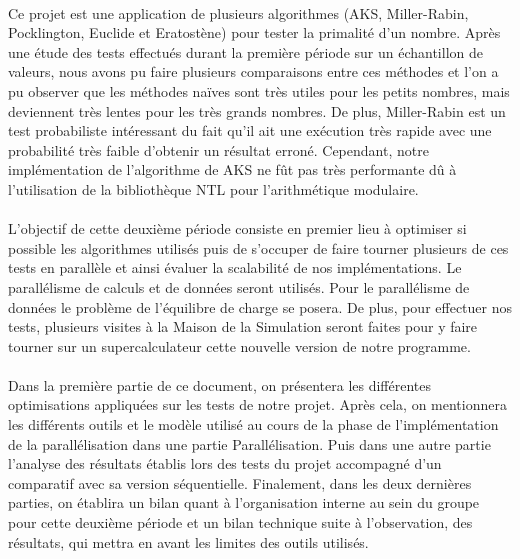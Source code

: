	\paragraph{}Ce projet est une application de plusieurs algorithmes (AKS, Miller-Rabin, Pocklington, Euclide et Eratostène) pour tester la primalité d'un nombre. Après une étude des tests effectués durant la première période sur un échantillon de valeurs, nous avons pu faire plusieurs comparaisons entre ces méthodes et l'on a pu observer que les méthodes naïves sont très utiles pour les petits nombres, mais deviennent très lentes pour les très grands nombres. De plus, Miller-Rabin est un test probabiliste intéressant du fait qu'il ait une exécution très rapide avec une probabilité très faible d'obtenir un résultat erroné. Cependant, notre implémentation de l'algorithme de AKS ne fût pas très performante dû à l'utilisation de la bibliothèque NTL pour l'arithmétique modulaire.
	
	\paragraph{}L'objectif de cette deuxième période consiste en premier lieu à optimiser si possible les algorithmes utilisés puis de s’occuper de faire tourner plusieurs de ces tests en parallèle et ainsi évaluer la scalabilité de nos implémentations. Le parallélisme de calculs et de données seront utilisés. Pour le parallélisme de données le problème de l'équilibre de charge se posera. De plus, pour effectuer nos tests, plusieurs visites à la Maison de la Simulation seront faites pour y faire tourner sur un supercalculateur cette nouvelle version de notre programme. 
	
	\paragraph{}Dans la première partie de ce document, on présentera les différentes optimisations appliquées sur les tests de notre projet.
	Après cela, on mentionnera les différents outils et le modèle utilisé au cours de la phase de l'implémentation de la parallélisation dans une partie Parallélisation. Puis dans une autre partie l'analyse des résultats établis lors des tests du projet accompagné d'un comparatif avec sa version séquentielle.
	Finalement, dans les deux dernières parties, on établira un bilan quant à l'organisation interne au sein du groupe pour cette deuxième période et un bilan technique suite à l'observation, des résultats, qui mettra en avant les limites des outils utilisés.
	
